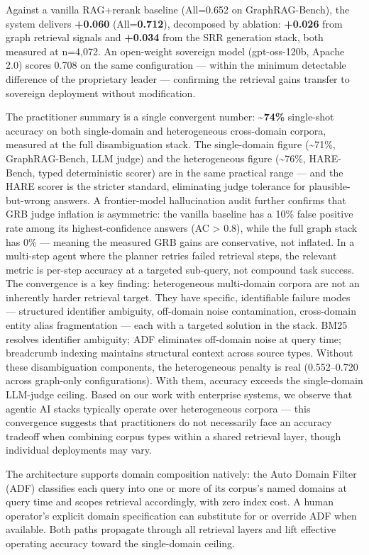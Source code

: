 Against a vanilla RAG+rerank baseline (All=0.652 on GraphRAG-Bench), the system delivers \textbf{+0.060} (All=\textbf{0.712}), decomposed by ablation: \textbf{+0.026} from graph retrieval signals and \textbf{+0.034} from the SRR generation stack, both measured at n=4,072. An open-weight sovereign model (gpt-oss-120b, Apache 2.0) scores 0.708 on the same configuration --- within the minimum detectable difference of the proprietary leader --- confirming the retrieval gains transfer to sovereign deployment without modification.

The practitioner summary is a single convergent number: \textbf{\textasciitilde74\%} single-shot accuracy on both single-domain and heterogeneous cross-domain corpora, measured at the full disambiguation stack. The single-domain figure (\textasciitilde71\%, GraphRAG-Bench, LLM judge) and the heterogeneous figure (\textasciitilde76\%, HARE-Bench, typed deterministic scorer) are in the same practical range --- and the HARE scorer is the stricter standard, eliminating judge tolerance for plausible-but-wrong answers. A frontier-model hallucination audit further confirms that GRB judge inflation is asymmetric: the vanilla baseline has a 10\% false positive rate among its highest-confidence answers (AC \textgreater{} 0.8), while the full graph stack has 0\% --- meaning the measured GRB gains are conservative, not inflated. In a multi-step agent where the planner retries failed retrieval steps, the relevant metric is per-step accuracy at a targeted sub-query, not compound task success. The convergence is a key finding: heterogeneous multi-domain corpora are not an inherently harder retrieval target. They have specific, identifiable failure modes --- structured identifier ambiguity, off-domain noise contamination, cross-domain entity alias fragmentation --- each with a targeted solution in the stack. BM25 resolves identifier ambiguity; ADF eliminates off-domain noise at query time; breadcrumb indexing maintains structural context across source types. Without these disambiguation components, the heterogeneous penalty is real (0.552--0.720 across graph-only configurations). With them, accuracy exceeds the single-domain LLM-judge ceiling. Based on our work with enterprise systems, we observe that agentic AI stacks typically operate over heterogeneous corpora --- this convergence suggests that practitioners do not necessarily face an accuracy tradeoff when combining corpus types within a shared retrieval layer, though individual deployments may vary.

The architecture supports domain composition natively: the Auto Domain Filter (ADF) classifies each query into one or more of its corpus's named domains at query time and scopes retrieval accordingly, with zero index cost. A human operator's explicit domain specification can substitute for or override ADF when available. Both paths propagate through all retrieval layers and lift effective operating accuracy toward the single-domain ceiling.

